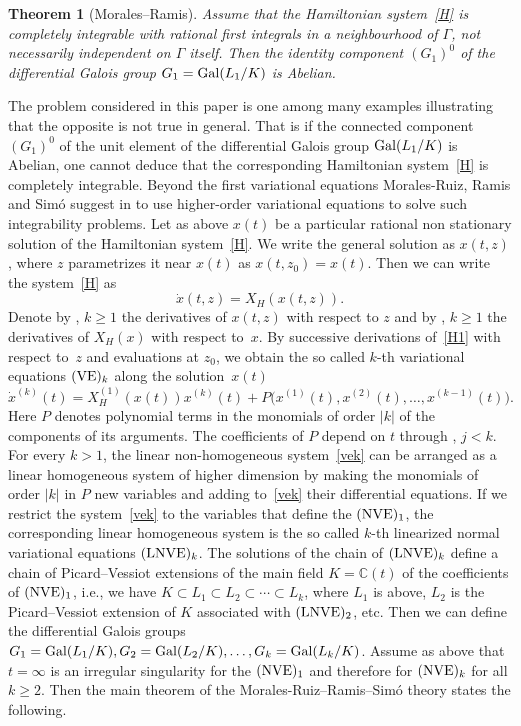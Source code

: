\documentclass[pdftex]{sigma}
\numberwithin{equation}{section}
\newtheorem{Theorem}{Theorem}[section]
\begin{document}
\begin{Theorem}[Morales--Ramis]%
 Assume that the Hamiltonian system~\eqref{H} is completely integrable with rational first integrals in a
 neighbourhood of $\Gamma$, not necessarily independent on $\Gamma$ itself. Then the identity component $(G_1)^0$ of the
 differential Galois group $G_1={\rm Gal}(L_1/K)$ is Abelian.
 \end{Theorem}

 The problem considered in this paper is one among many examples illustrating that the opposite is not true in general.
 That is if the connected component $(G_1)^0$ of the unit element of the differential Galois group ${\rm Gal}(L_1/K)$ is
 Abelian, one cannot deduce that the corresponding Hamiltonian system~\eqref{H} is completely integrable. Beyond the first
 variational equations Morales-Ruiz, Ramis and Sim\'{o} suggest in \cite{MRS} to use higher-order variational equations
 to solve such integrability problems. Let as above $x(t)$ be a particular rational non stationary solution of the Hamiltonian
 system~\eqref{H}. We write the general solution as $x(t, z)$, where $z$ parametrizes it near $x(t)$ as $x(t, z_0)=x(t)$.
 Then we can write the system~\eqref{H} as
 \begin{equation}
 \dot{x}(t, z)=X_H(x(t, z)) .\label{H1}
 \end{equation}
 Denote by , $k \geq 1$ the derivatives of $x(t, z)$ with respect to $z$ and by
 , $k \geq 1$ the derivatives of $X_H(x)$ with respect to~$x$. By successive derivations of~\eqref{H1} with respect
 to~$z$ and evaluations at $z_0$, we obtain the so called $k$-th variational equations $({\rm VE})_k$ along the solution~$x(t)$%
 \begin{equation}
 \dot{x}^{(k)}(t)=X^{(1)}_H(x(t)) x^{(k)}(t) + P\bigl(x^{(1)}(t), x^{(2)}(t), \dots, x^{(k-1)}(t)\bigr) .\label{vek}
 \end{equation}
 Here $P$ denotes polynomial terms in the monomials of order $|k|$ of the components of its arguments. The coefficients
 of $P$ depend on $t$ through , $j < k$. For every $k > 1$, the linear non-homogeneous system~\eqref{vek}
 can be arranged as a linear homogeneous system of higher dimension by making the monomials of order $|k|$ in $P$ new
 variables and adding to~\eqref{vek} their differential equations. If we restrict the system~\eqref{vek} to the variables
 that define the $({\rm NVE})_1$, the corresponding linear homogeneous system is the so called $k$-th linearized
 normal variational equations $({\rm LNVE})_k$. The solutions of the chain of $({\rm LNVE})_k$ define a chain
 of Picard--Vessiot extensions of the main field $K=\mathbb{C}(t)$ of the coefficients of $({\rm NVE})_1$, i.e., we have
 $K \subset L_1 \subset L_2 \subset \cdots \subset L_k$, where $L_1$ is above, $L_2$ is the Picard--Vessiot extension
 of $K$ associated with $({\rm LNVE})_2$, etc. Then we can define the differential Galois groups
 $G_1={\rm Gal}(L_1/K), G_2={\rm Gal}(L_2/K), \dots, G_k={\rm Gal}(L_k/K)$. Assume as above that $t=\infty$ is an irregular singularity for the $({\rm NVE})_1$
 and therefore for $({\rm NVE})_k$ for all $k \geq 2$. Then the main theorem of the
 Morales-Ruiz--Ramis--Sim\'{o} theory states the following.
\end{document}
